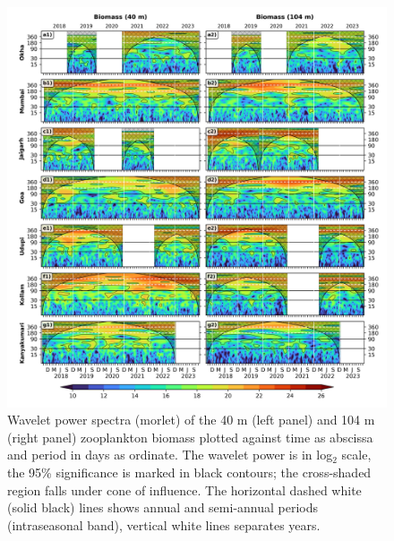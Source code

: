 \documentclass[authoryear,review,12pt]{elsarticle}
\begin{document}
\begin{figure}[htbp]
	\centering
	\includegraphics[width=\textwidth]{./figures/west_coast_wavelet_40m_104m.jpeg} 
	\captionsetup{justification=justified,font=footnotesize,skip=0.05\baselineskip,width=\textwidth}
	\caption{Wavelet power spectra (morlet) of the 40 m (left panel) and 104 m (right panel) zooplankton biomass plotted against time as abscissa and period in days as ordinate. The wavelet power is in log$_2$ scale, the 95\% significance is marked in black contours; the cross-shaded region falls under cone of influence. The horizontal dashed white (solid black) lines shows annual and semi-annual periods (intraseasonal band), vertical white lines separates years.}
	\label{fig:wave40104}
\end{figure}
\end{document}
